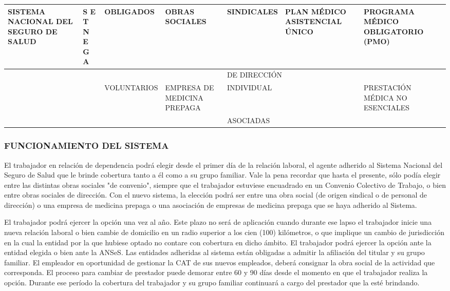 
\begin{center}
\small
\begin{tabular}{|p{}|p{}|p{}|p{}|p{}|p{}|p{}|}
\hline
SISTEMA NACIONAL DEL SEGURO DE SALUD & S E T N E G A & OBLIGADOS & OBRAS SOCIALES & SINDICALES & PLAN MÉDICO ASISTENCIAL ÚNICO & PROGRAMA MÉDICO OBLIGATORIO (PMO) \\ \hline
 &  &  &  & \multicolumn{3}{|p{\dimexpr0.498\linewidth-2\tabcolsep\relax}|}{DE DIRECCIÓN} \\ \hline
 &  & VOLUNTARIOS & EMPRESA DE MEDICINA PREPAGA & \multicolumn{2}{|p{\dimexpr0.317\linewidth-2\tabcolsep\relax}|}{INDIVIDUAL} & PRESTACIÓN MÉDICA NO ESENCIALES \\ \hline
 &  &  &  & \multicolumn{3}{|p{\dimexpr0.498\linewidth-2\tabcolsep\relax}|}{ASOCIADAS} \\ \hline
\end{tabular}
\end{center}

\subsubsection*{FUNCIONAMIENTO DEL SISTEMA}
El trabajador en relación de dependencia podrá elegir desde el primer día de la relación laboral, el agente adherido al Sistema Nacional del Seguro de Salud que le brinde cobertura tanto a él como a su grupo familiar. Vale la pena recordar que hasta el presente, sólo podía elegir entre las distintas obras sociales "de convenio", siempre que el trabajador estuviese encuadrado en un Convenio Colectivo de Trabajo, o bien entre obras sociales de dirección. Con el nuevo sistema, la elección podrá ser entre una obra social (de origen sindical o de personal de dirección) o una empresa de medicina prepaga o una asociación de empresas de medicina prepaga que se haya adherido al Sistema.

El trabajador podrá ejercer la opción una vez al año. Este plazo no será de aplicación cuando durante ese lapso el trabajador inicie una nueva relación laboral o bien cambie de domicilio en un radio superior a los cien (100) kilómetros, o que implique un cambio de jurisdicción en la cual la entidad por la que hubiese optado no contare con cobertura en dicho ámbito. El trabajador podrá ejercer la opción ante la entidad elegida o bien ante la ANSeS. Las entidades adheridas al sistema están obligadas a admitir la afiliación del titular y su grupo familiar. El empleador en oportunidad de gestionar la CAT de sus nuevos empleados, deberá consignar la obra social de la actividad que corresponda. El proceso para cambiar de prestador puede demorar entre 60 y 90 días desde el momento en que el trabajador realiza la opción. Durante ese período la cobertura del trabajador y su grupo familiar continuará a cargo del prestador que la esté brindando.

